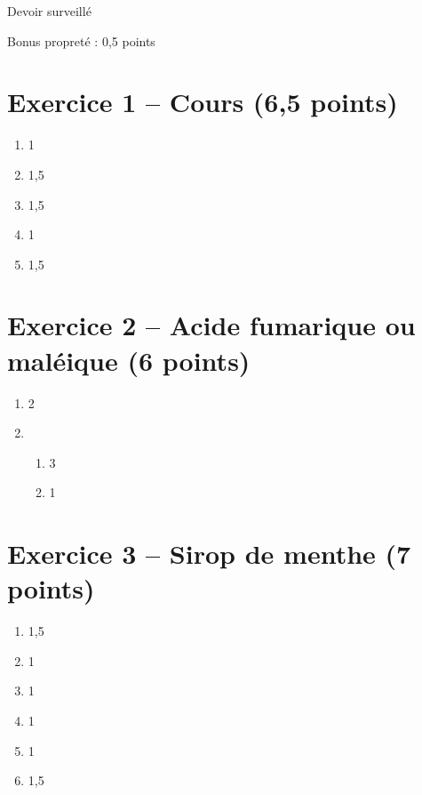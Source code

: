 
\usepackage{setspace}



\begin{header}
Devoir surveillé
\normalsize
\flushleft
\end{header}

Bonus propreté : 0,5 points

\section*{Exercice 1 -- Cours (6,5 points)}

\begin{enumerate}
\item 1

\item 1,5

\item 1,5

\item 1

\item 1,5
\end{enumerate}

\section*{Exercice 2 -- Acide fumarique ou maléique (6 points)}

\begin{enumerate}
\item 2

\item
\begin{enumerate}
\item 3
\item 1
\end{enumerate}
\end{enumerate}

\section*{Exercice 3 -- Sirop de menthe (7 points)}

\begin{enumerate}
\item 1,5

\item 1

\item 1

\item 1

\item 1

\item 1,5
\end{enumerate}

